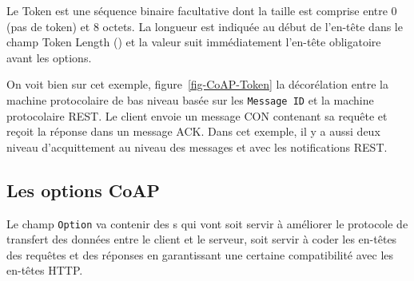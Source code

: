          \vspace{1em}

Le Token est une séquence binaire facultative dont la taille est comprise entre 0 (pas de token) et 8 octets. La longueur est indiquée au début de l’en-tête dans le champ Token Length (\texttt{}) et la valeur suit immédiatement l'en-tête obligatoire avant les options.

         \vspace{1em}

On voit bien sur cet exemple, figure~\vref{fig-CoAP-Token} la décorélation entre la machine protocolaire de bas niveau basée sur les \texttt{Message ID} et la machine protocolaire REST. Le client envoie un message CON contenant sa requête et reçoit la réponse dans un message ACK. Dans cet exemple, il y a aussi deux niveau d'acquittement au niveau des messages et avec les notifications REST.


\subsection{Les options CoAP}

Le champ \texttt{Option} va contenir des s qui vont soit servir à améliorer le protocole de transfert des données entre le client et le serveur, soit servir à coder les en-têtes des requêtes et des réponses en garantissant une certaine compatibilité avec les en-têtes HTTP.

